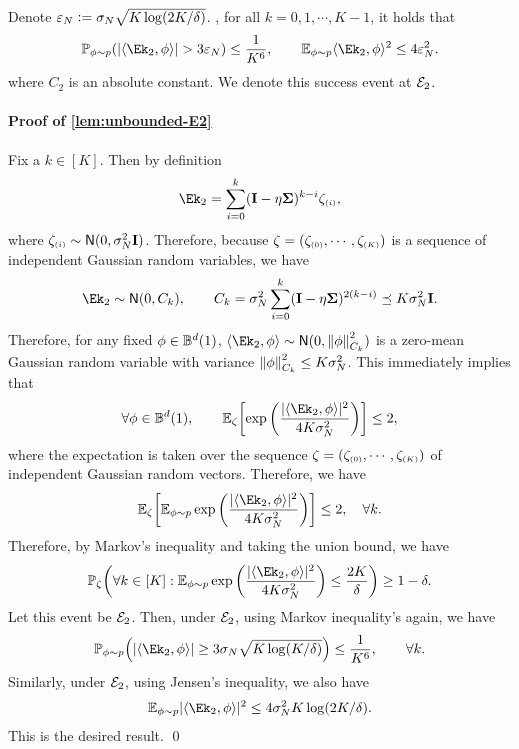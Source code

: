 \begin{lemma}\label{lem:unbounded-E2}
Denote $\varepsilon_N\mathrel{\mathop:}= \sigma_{N}\sqrt{K\log(2K/\delta)}$. \Whp, for all $k=0,1,\cdots,K-1$, it holds that
\begin{align*}
    \Pp{ \absn{\lr \Ek_2, \x\rr}> 3\epsN}\leq \frac{1}{K^6}, \qquad
    \Epp\lr \Ek_2, \x\rr^2\leq 4\epsN^2.
\end{align*}
where $C_2$ is an absolute constant. We denote this success event at $\mathcal{E}_2$.
\end{lemma}

\paragraph{Proof of \cref{lem:unbounded-E2}}
Fix a $k\in[K]$. Then by definition
\begin{align*}
    \Ek_2=\sum_{i=0}^{k} (\id-\eta\bSigma)^{k-i}\zeta\epk{i},
\end{align*}
where $\zeta_{\scriptscriptstyle{ (i) }}\sim \mathsf{N}(0,\sigma_{N}^2\mathbf{I})$. Therefore, because $\zeta=(\zeta_{\scriptscriptstyle{ (0) }},\cdots,\zeta_{\scriptscriptstyle{ (K) }})$ is a sequence of independent Gaussian random variables, we have
\begin{align*}
    \Ek_2\sim \normal{0, C_k}, \qquad C_k=\sigsp^2\sum_{i=0}^{k}(\id-\eta\bSigma)^{2(k-i)}\preceq K\sigsp^2 \id.
\end{align*}
Therefore, for any fixed $\phi\in\mathbb{B}^d(1)$, $\lr \Ek_2,\x\rr\sim \normal{0,\nrm{\x}^2_{C_k}}$ is a zero-mean Gaussian random variable with variance $\left\|\phi\right\|^2_{C_k}\leq K\sigma_{N}^2$. This immediately implies that
\begin{align*}
    \forall \x\in\Bone, \qquad 
    \EE_\zeta\brac{ \exp\paren{ \frac{\absn{\lr \Ek_2,\x\rr}^2 }{4K\sigsp^2} } }\leq 2,
\end{align*}
where the expectation is taken over the sequence $\zeta=(\zeta_{\scriptscriptstyle{ (0) }},\cdots,\zeta_{\scriptscriptstyle{ (K) }})$ of independent Gaussian random vectors. Therefore, we have
\begin{align*}
    \EE_\zeta\brac{ \Epp{\exp\paren{ \frac{\absn{\lr \Ek_2,\x\rr}^2 }{4K\sigsp^2} }} } \leq 2, \quad\forall k.
\end{align*}
Therefore, by Markov's inequality and taking the union bound, we have
\begin{align*}
    \PP_\zeta\paren{ \forall k\in[K]: \Epp{\exp\paren{ \frac{\absn{\lr \Ek_2,\x\rr}^2 }{4K\sigsp^2} } }\leq \frac{2K}{\delta} }\geq 1-\delta.
\end{align*}
Let this event be $\mathcal{E}_2$. Then, under $\mathcal{E}_2$, 
using Markov inequality's again, we have
\begin{align*}
    \Pp{\absn{\lr \Ek_2,\x\rr}\geq 3\sigsp\sqrt{K\log(K/\delta)}}\leq \frac{1}{K^6}, \qquad \forall k.
\end{align*}
Similarly, under $\mathcal{E}_2$, using Jensen's inequality, we also have
\begin{align*}
    \Epp{\absn{\lr \Ek_2,\x\rr}^2}\leq  4\sigsp^2 K\log(2K/\delta).
\end{align*}
This is the desired result.
\qed



